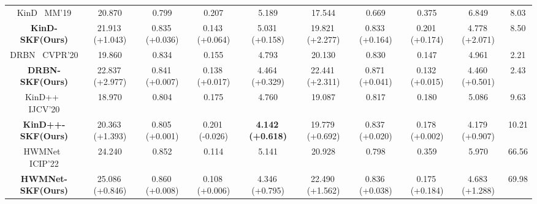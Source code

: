 \documentclass[10pt,twocolumn,letterpaper]{article}
\begin{document}
\begin{table*}[ht]
{\begin{tabular}{c|c|c|c|c|c|c|c|c|c}
    \midrule
    \midrule
    KinD~\cite{zhang2019kind} \scriptsize MM'19 & 20.870  & 0.799  & 0.207  & 5.189  & 17.544  & 0.669  & 0.375  & 6.849  & 8.03  \\ \textbf{KinD-SKF(Ours)} & 21.913\,\footnotesize \textcolor{green1}{(+1.043)} & 0.835\,\footnotesize \textcolor{green1}{(+0.036)} & 0.143\,\footnotesize \textcolor{green1}{(+0.064)} & 5.031\,\footnotesize \textcolor{green1}{(+0.158)} & 19.821\,\footnotesize \textcolor{green1}{(+2.277)} & 0.833\,\footnotesize \textcolor{green1}{(+0.164)} & 0.201\,\footnotesize \textcolor{green1}{(+0.174)} & 4.778\,\footnotesize \textcolor{green1}{(+2.071)} & 8.50  \\
    \midrule
    \midrule
    DRBN~\cite{yang2020drbn} \scriptsize CVPR'20 & 19.860  & 0.834  & 0.155  & 4.793  & 20.130  & 0.830  & 0.147  & 4.961  & 2.21  \\ \textbf{DRBN-SKF(Ours)} & 22.837\,\footnotesize \textcolor{green1}{(+2.977)} & 0.841\,\footnotesize \textcolor{green1}{(+0.007)} & 0.138\,\footnotesize \textcolor{green1}{(+0.017)} & 4.464\,\footnotesize \textcolor{green1}{(+0.329)} & 22.441\,\footnotesize \textcolor{green1}{(+2.311)} & 0.871\,\footnotesize \textcolor{green1}{(+0.041)} & 0.132\,\footnotesize \textcolor{green1}{(+0.015)} & 4.460\,\footnotesize \textcolor{green1}{(+0.501)} & 2.43  \\
    \midrule
    \midrule
    KinD++~\cite{zhang2021kindplus} \scriptsize IJCV'20 & 18.970  & 0.804  & 0.175  & 4.760  & 19.087  & 0.817  & 0.180  & 5.086  & 9.63  \\ \textbf{KinD++-SKF(Ours)} & 20.363\,\footnotesize \textcolor{green1}{(+1.393)} & 0.805\,\footnotesize \textcolor{green1}{(+0.001)} & 0.201\,\footnotesize \textcolor{red1}{(-0.026)} & \textbf{4.142}\,\footnotesize \textcolor{green1}{\textbf{(+0.618)}} & 19.779\,\footnotesize \textcolor{green1}{(+0.692)} & 0.837\,\footnotesize \textcolor{green1}{(+0.020)} & 0.178\,\footnotesize \textcolor{green1}{(+0.002)} & 4.179\,\footnotesize \textcolor{green1}{(+0.907)} & 10.21  \\
    \midrule
    \midrule
    HWMNet~\cite{fan2022hwmnet} \scriptsize ICIP'22 & 24.240  & 0.852  & 0.114  & 5.141  & 20.928  & 0.798  & 0.359  & 5.970  & 66.56  \\ \textbf{HWMNet-SKF(Ours)} & 25.086\,\footnotesize \textcolor{green1}{(+0.846)} & 0.860\,\footnotesize \textcolor{green1}{(+0.008)} & 0.108\,\footnotesize \textcolor{green1}{(+0.006)} & 4.346\,\footnotesize \textcolor{green1}{(+0.795)} & 22.490\,\footnotesize \textcolor{green1}{(+1.562)} & 0.836\,\footnotesize \textcolor{green1}{(+0.038)} & 0.175\,\footnotesize \textcolor{green1}{(+0.184)} & 4.683\,\footnotesize \textcolor{green1}{(+1.288)} & 69.98  \\

\end{tabular}}
\end{table*}
\end{document}
